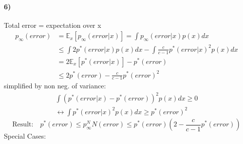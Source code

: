 \documentclass[11pt]{article}
\begin{document}
        \paragraph{6)}
          Total error = expectation over x
          \begin{equation*}
            \begin{align*}
              p_\infty(error)&=\mathbb{E}_x[p_\infty(error|x)] = \int p_\infty
              (error|x)p(x)dx \\
              &\leq \int 2p^*(error|x)p(x)dx-\int \frac{c}{c-1}p^*(error|x)^2
              p(x)dx \\
              &=2\mathbb{E}_x[p^*(error|x)]-p^*(error)  \\
              &\leq2p^*(error)-\frac{c}{c-1}p^*(error)^2
            \end{align*}
          \end{equation*}
          simplified by non neg. of variance:
          \begin{equation*}
            \begin{multlined}
              \int(p^*(error|x)-p^*(error))^2 p(x)dx \geq 0 \\
              \leftrightarrow \int p^*(error|x)^2p(x)dx \geq p^*(error)^2
            \end{multlined}
          \end{equation*}
          \begin{equation*}
            \text{Result:} \quad p^*(error) \leq p_\infty^NN (error) \leq p^*(error)(2-\frac{c}{c-1}
            p^*(error))
          \end{equation*}
          Special Cases:
\end{document}
